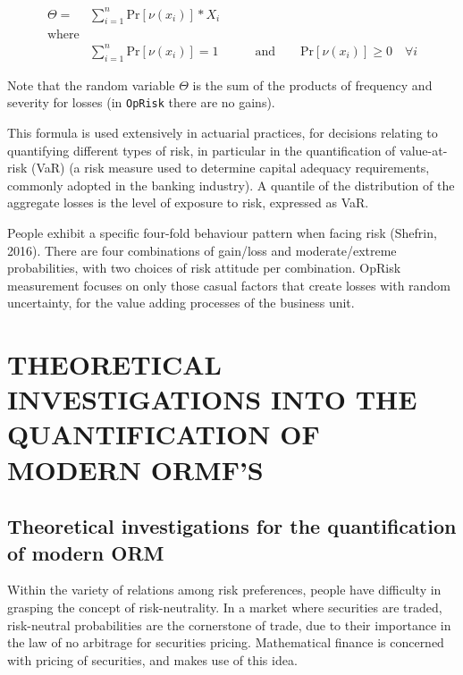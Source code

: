 \documentclass[]{DissertateUSU}
\begin{document}
\begin{eqnarray}\label{eqn3}
\Theta = &\sum_{i=1}^{n}\mbox{Pr}[\nu (x_{i})]*X_i & \\
 \mbox{where} \nonumber\\
&\sum_{i=1}^{n}\mbox{Pr}[\nu (x_{i})] = 1 &\qquad \mbox{and} \qquad \mbox{Pr}[\nu (x_{i})] \geq 0 \quad \forall i\nonumber
\end{eqnarray}

\doublespacing

Note that the random variable \(\Theta\) is the sum of the products of
frequency and severity for losses (in \texttt{OpRisk} there are no
gains).\medskip

This formula is used extensively in actuarial practices, for decisions
relating to quantifying different types of risk, in particular in the
quantification of value-at-risk (VaR) (a risk measure used to determine
capital adequacy requirements, commonly adopted in the banking
industry). A quantile of the distribution of the aggregate losses is the
level of exposure to risk, expressed as VaR.\medskip

People exhibit a specific four-fold behaviour pattern when facing risk
(Shefrin, 2016). There are four combinations of gain/loss and
moderate/extreme probabilities, with two choices of risk attitude per
combination. OpRisk measurement focuses on only those casual factors
that create losses with random uncertainty, for the value adding
processes of the business unit.

\singlespacing

\FloatBarrier
\newpage
{}
\fancyhead[R]{\thepage} \fancyfoot[C]{}

\chapter{THEORETICAL INVESTIGATIONS INTO THE QUANTIFICATION OF MODERN ORMF'S}

\doublespacing

\section{Theoretical investigations for the quantification of modern ORM}

Within the variety of relations among risk preferences, people have
difficulty in grasping the concept of risk-neutrality. In a market where
securities are traded, risk-neutral probabilities are the cornerstone of
trade, due to their importance in the law of no arbitrage for securities
pricing. Mathematical finance is concerned with pricing of securities,
and makes use of this idea.\medskip
\end{document}
